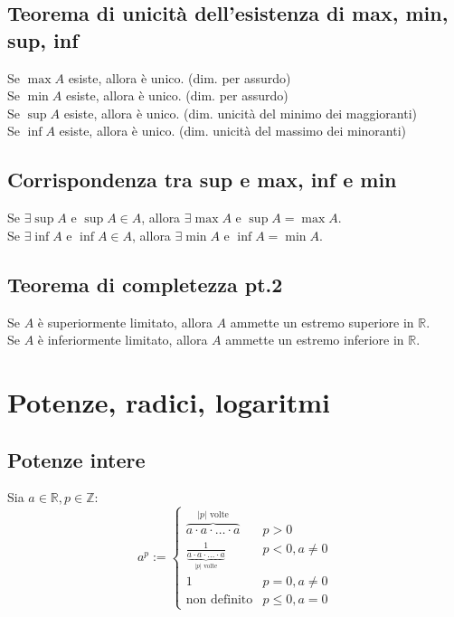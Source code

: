 \documentclass[a4paper]{article}
\begin{document}
\subsection{Teorema di unicità dell'esistenza di max, min, sup, inf}
Se \(\max A\) esiste, allora è unico. (dim. per assurdo) \\
Se \(\min A\) esiste, allora è unico. (dim. per assurdo) \\
Se \(\sup A\) esiste, allora è unico. (dim. unicità del minimo dei maggioranti) \\
Se \(\inf A\) esiste, allora è unico. (dim. unicità del massimo dei minoranti)


\subsection{Corrispondenza tra sup e max, inf e min}
Se \(\exists \sup A\) e \(\sup A \in A\), allora \(\exists \max A\) e \(\sup A = \max A\). \\
Se \(\exists \inf A\) e \(\inf A \in A\), allora \(\exists \min A\) e \(\inf A = \min A\).


\subsection{Teorema di completezza pt.2}
Se \(A\) è superiormente limitato, allora \(A\) ammette un estremo superiore in \(\mathbb{R}\). \\
Se \(A\) è inferiormente limitato, allora \(A\) ammette un estremo inferiore in \(\mathbb{R}\).


\newpage

\section{Potenze, radici, logaritmi}
\subsection{Potenze intere}
Sia \(a \in \mathbb{R}, p \in \mathbb{Z}\):
\[ a ^ p := 
\begin{cases}
	\overbrace{a \cdot a \cdot \ldots \cdot a}^{\left|p\right| \text{ volte}} & p > 0 \\
	\displaystyle \frac{1}{\underbrace{a \cdot a \cdot \ldots \cdot a}_{\left|p\right| \text{ volte}} } & p < 0, a \neq 0 \\
	1 & p = 0, a \neq 0 \\
	\text{non definito} & p \leq 0, a = 0
\end{cases}
\]
\end{document}
